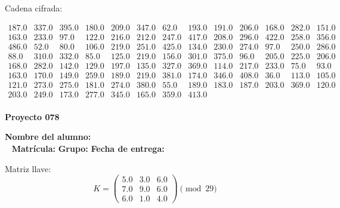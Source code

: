 \documentclass[12pt]{article}
\begin{document}
Cadena cifrada:
\begin{center}
$\begin{array}{lllllllllllll}
187.0 & 337.0 & 395.0 & 180.0 & 209.0 & 347.0 & 62.0 & 193.0 & 191.0 & 206.0 & 168.0 & 282.0 & 151.0\\
163.0 & 233.0 & 97.0 & 122.0 & 216.0 & 212.0 & 247.0 & 417.0 & 208.0 & 296.0 & 422.0 & 258.0 & 356.0\\
486.0 & 52.0 & 80.0 & 106.0 & 219.0 & 251.0 & 425.0 & 134.0 & 230.0 & 274.0 & 97.0 & 250.0 & 286.0\\
88.0 & 310.0 & 332.0 & 85.0 & 125.0 & 219.0 & 156.0 & 301.0 & 375.0 & 96.0 & 205.0 & 225.0 & 206.0\\
168.0 & 282.0 & 142.0 & 129.0 & 197.0 & 135.0 & 327.0 & 369.0 & 114.0 & 217.0 & 233.0 & 75.0 & 93.0\\
163.0 & 170.0 & 149.0 & 259.0 & 189.0 & 219.0 & 381.0 & 174.0 & 346.0 & 408.0 & 36.0 & 113.0 & 105.0\\
121.0 & 273.0 & 275.0 & 181.0 & 274.0 & 380.0 & 55.0 & 189.0 & 183.0 & 187.0 & 203.0 & 369.0 & 120.0\\
203.0 & 249.0 & 173.0 & 277.0 & 345.0 & 165.0 & 359.0 & 413.0\\
\end{array}$
\end{center}

\newpage


\textbf{Proyecto 078}

\textbf{Nombre del alumno:} \underline{\hspace{13cm}}\\\
\vspace{1cm}
\textbf{Matrícula:} \underline{\hspace{4cm}} \hspace{1cm}
\textbf{Grupo:} \underline{\hspace{2cm}}
\textbf{Fecha de entrega:} \underline{\hspace{2cm}}

\medskip

Matriz llave:
\[
K = \begin{pmatrix}
5.0 & 3.0 & 6.0\\
7.0 & 9.0 & 6.0\\
6.0 & 1.0 & 4.0
\end{pmatrix} \pmod{29}
\]
\end{document}

